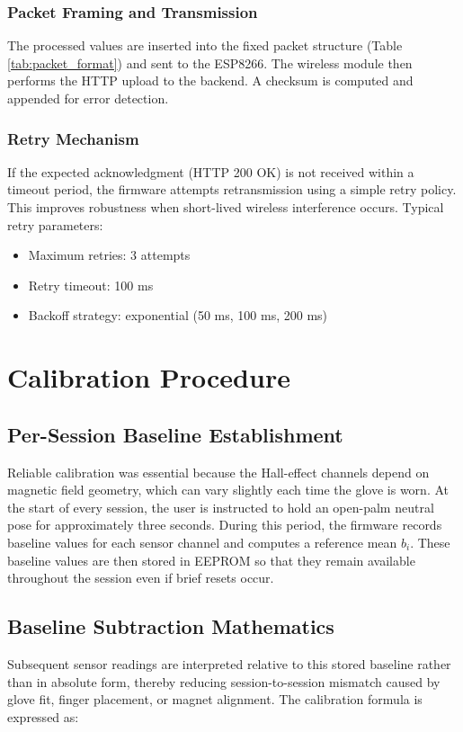 \documentclass[12pt,a4paper]{report}
\begin{document}
\subsubsection{Packet Framing and Transmission}
The processed values are inserted into the fixed packet structure (Table \ref{tab:packet_format}) and sent to the ESP8266. The wireless module then performs the HTTP upload to the backend. A checksum is computed and appended for error detection.

\subsubsection{Retry Mechanism}
If the expected acknowledgment (HTTP 200 OK) is not received within a timeout period, the firmware attempts retransmission using a simple retry policy. This improves robustness when short-lived wireless interference occurs. Typical retry parameters:
\begin{itemize}
  \item Maximum retries: 3 attempts
  \item Retry timeout: 100 ms
  \item Backoff strategy: exponential (50 ms, 100 ms, 200 ms)
\end{itemize}

\section{Calibration Procedure}
\label{sec:impl_calibration}

\subsection{Per-Session Baseline Establishment}
Reliable calibration was essential because the Hall-effect channels depend on magnetic field geometry, which can vary slightly each time the glove is worn. At the start of every session, the user is instructed to hold an open-palm neutral pose for approximately three seconds. During this period, the firmware records baseline values for each sensor channel and computes a reference mean $b_i$. These baseline values are then stored in EEPROM so that they remain available throughout the session even if brief resets occur.

\subsection{Baseline Subtraction Mathematics}
Subsequent sensor readings are interpreted relative to this stored baseline rather than in absolute form, thereby reducing session-to-session mismatch caused by glove fit, finger placement, or magnet alignment. The calibration formula is expressed as:
\end{document}
